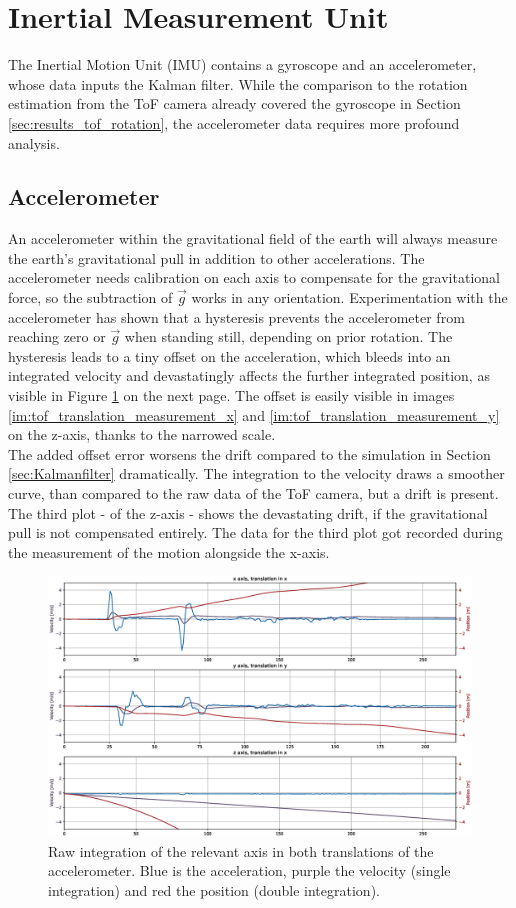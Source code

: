 \section{Inertial Measurement Unit}
\label{sec:IMU_results}
The Inertial Motion Unit (IMU) contains a gyroscope and an accelerometer, whose data inputs the Kalman filter. While the comparison to the rotation estimation from the ToF camera already covered the gyroscope in Section \ref{sec:results_tof_rotation}, the accelerometer data requires more profound analysis.
\subsection{Accelerometer}
\label{sec:accel_results}
An accelerometer within the gravitational field of the earth will always measure the earth's gravitational pull in addition to other accelerations. The accelerometer needs calibration on each axis to compensate for the gravitational force, so the subtraction of $\vec{g}$ works in any orientation. Experimentation with the accelerometer has shown that a hysteresis prevents the accelerometer from reaching zero or $\vec{g}$ when standing still, depending on prior rotation. The hysteresis leads to a tiny offset on the acceleration, which bleeds into an integrated velocity and devastatingly affects the further integrated position, as visible in Figure \ref{im:accelometer_integrated} on the next page. The offset is easily visible in images \ref{im:tof_translation_measurement_x} and \ref{im:tof_translation_measurement_y} on the z-axis, thanks to the narrowed scale.\\
The added offset error worsens the drift compared to the simulation in Section \ref{sec:Kalmanfilter} dramatically. The integration to the velocity draws a smoother curve, than compared to the raw data of the ToF camera, but a drift is present. The third plot - of the z-axis - shows the devastating drift, if the gravitational pull is not compensated entirely. The data for the third plot got recorded during the measurement of the motion alongside the x-axis.
\begin{figure}[H]
  \centering
  \includegraphics[width=1.0\textwidth]{images/accelerometer_translation_drift.eps}
  \caption{Raw integration of the relevant axis in both translations of the accelerometer. Blue is the acceleration, purple the velocity (single integration) and red the position (double integration).}
  \label{im:accelometer_integrated}
\end{figure} 
